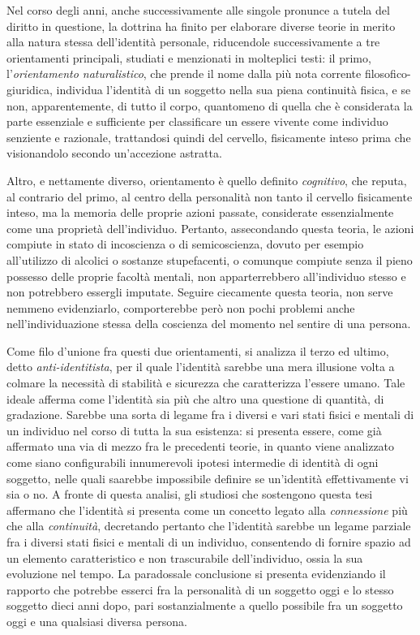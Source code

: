 Nel corso degli anni, anche successivamente alle singole pronunce a tutela del diritto in questione, la dottrina ha finito per elaborare diverse teorie in merito alla natura stessa dell'identità personale, riducendole successivamente a tre orientamenti principali, studiati e menzionati in molteplici testi: il primo, l'\textit{orientamento naturalistico}, che prende il nome dalla più nota corrente filosofico-giuridica, individua l'identità di un soggetto nella sua piena continuità fisica, e se non, apparentemente, di tutto il corpo, quantomeno di quella che è considerata la parte essenziale e sufficiente per classificare un essere vivente come individuo senziente e razionale, trattandosi quindi del cervello, fisicamente inteso prima che visionandolo secondo un'accezione astratta.

Altro, e nettamente diverso, orientamento è quello definito \textit{cognitivo}, che reputa, al contrario del primo, al centro della personalità non tanto il cervello fisicamente inteso, ma la memoria delle proprie azioni passate, considerate essenzialmente come una proprietà dell'individuo. Pertanto, assecondando questa teoria, le azioni compiute in stato di incoscienza o di semicoscienza, dovuto per esempio all'utilizzo di alcolici o sostanze stupefacenti, o comunque compiute senza il pieno possesso delle proprie facoltà mentali, non apparterrebbero all'individuo stesso e non potrebbero essergli imputate. Seguire ciecamente questa teoria, non serve nemmeno evidenziarlo, comporterebbe però non pochi problemi anche nell'individuazione stessa della coscienza del momento nel sentire di una persona. 

Come filo d'unione fra questi due orientamenti, si analizza il terzo ed ultimo, detto \textit{anti-identitista}, per il quale l'identità sarebbe una mera illusione volta a colmare la necessità di stabilità e sicurezza che caratterizza l'essere umano. Tale ideale afferma come l'identità sia più che altro una questione di quantità, di gradazione. Sarebbe una sorta di legame fra i diversi e vari stati fisici e mentali di un individuo nel corso di tutta la sua esistenza: si presenta essere, come già affermato una via di mezzo fra le precedenti teorie, in quanto viene analizzato come siano configurabili innumerevoli ipotesi intermedie di identità di ogni soggetto, nelle quali saarebbe impossibile definire se un’identità effettivamente vi sia o no. A fronte di questa analisi, gli studiosi che sostengono questa tesi affermano  che l'identità si presenta come un concetto legato alla \textit{connessione} più che alla \textit{continuità}, decretando pertanto che l’identità sarebbe un legame parziale fra i diversi stati fisici e mentali di un individuo, consentendo di fornire spazio ad un elemento caratteristico e non trascurabile dell'individuo, ossia la sua evoluzione nel tempo. La paradossale conclusione si presenta evidenziando il rapporto che potrebbe esserci fra la personalità di un soggetto oggi e lo stesso soggetto dieci anni dopo, pari sostanzialmente a quello possibile fra un soggetto oggi e una qualsiasi diversa persona.

